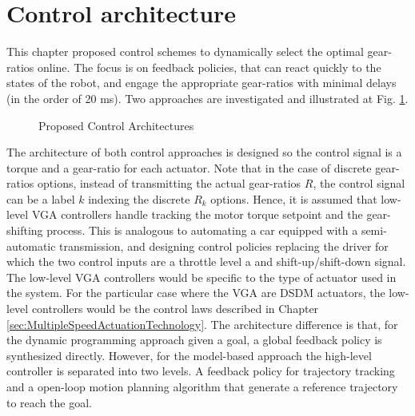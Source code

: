 \newpage

\section{Control architecture}
\label{sec:arch}

This chapter proposed control schemes to dynamically select the optimal gear-ratios online. The focus is on feedback policies, that can react quickly to the states of the robot, and engage the appropriate gear-ratios with minimal delays (in the order of 20 ms). Two approaches are investigated and illustrated at Fig. \ref{fig:controlarchitectures}. 
%
\begin{figure}[H]
				\vspace{-10pt}
        \centering
				\hspace{+10pt}
        \caption{Proposed Control Architectures}
				\label{fig:controlarchitectures}
\end{figure}
%
The architecture of both control approaches is designed so the control signal is a torque and a gear-ratio for each actuator. Note that in the case of discrete gear-ratios options, instead of transmitting the actual gear-ratios $R$, the control signal can be a label $k$ indexing the discrete $R_k$ options. Hence, it is assumed that low-level VGA controllers handle tracking the motor torque setpoint and the gear-shifting process. This is analogous to automating a car equipped with a semi-automatic transmission, and designing control policies replacing the driver for which the two control inputs are a throttle level a and shift-up/shift-down signal. The low-level VGA controllers would be specific to the type of actuator used in the system. For the particular case where the VGA are DSDM actuators, the low-level controllers would be the control laws described in Chapter \ref{sec:MultipleSpeedActuationTechnology}. The architecture difference is that, for the dynamic programming approach given a goal, a global feedback policy is synthesized directly. However, for the model-based approach the high-level controller is separated into two levels. A feedback policy for trajectory tracking and a open-loop motion planning algorithm that generate a reference trajectory to reach the goal. 

